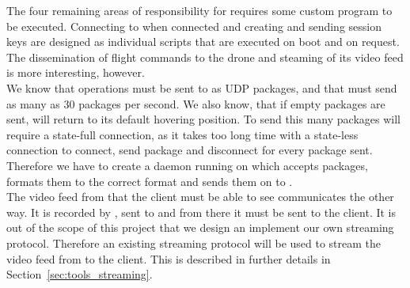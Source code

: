 The four remaining areas of responsibility for  requires some custom program to be executed.
Connecting to  when connected and creating and sending session keys are designed as individual scripts that are executed on boot and on request. 
The dissemination of flight commands to the drone and steaming of its video feed is more interesting, however. \\

We know that operations must be sent to  as UDP packages, and that  must send as many as 30 packages per second. 
We also know, that if empty packages are sent,  will return to its default hovering position. 
To send this many packages will require a state-full connection, as it takes too long time with a state-less connection to connect, send package and disconnect for every package sent. 
Therefore we have to create a daemon running on  which accepts packages, formats them to the correct format and sends them on to .  \\

The video feed from  that the client must be able to see communicates the other way. 
It is recorded by , sent to  and from there it must be sent to the client. 
It is out of the scope of this project that we design an implement our own streaming protocol. 
Therefore an existing streaming protocol will be used to stream the video feed from  to the client. 
This is described in further details in Section~\ref{sec:tools_streaming}.




